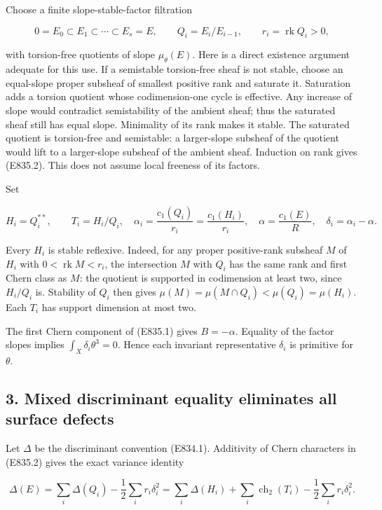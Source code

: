 Choose a finite slope-stable-factor filtration

\[
 0=E_0\subset E_1\subset\cdots\subset E_s=E,
 \qquad Q_i=E_i/E_{i-1},\qquad r_i=\operatorname{rk}Q_i>0,
 \tag{E835.2}
\]

with torsion-free quotients of slope \(\mu_\theta(E)\). Here is a direct
existence argument adequate for this use. If a semistable torsion-free
sheaf is not stable, choose an equal-slope proper subsheaf of smallest
positive rank and saturate it. Saturation adds a torsion quotient whose
codimension-one cycle is effective. Any increase of slope would
contradict semistability of the ambient sheaf; thus the saturated sheaf
still has equal slope. Minimality of its rank makes it stable. The
saturated quotient is torsion-free and semistable: a larger-slope
subsheaf of the quotient would lift to a larger-slope subsheaf of the
ambient sheaf. Induction on rank gives (E835.2). This does not assume
local freeness of its factors.

Set

\[
 H_i=Q_i^{**},\qquad T_i=H_i/Q_i,
 \quad \alpha_i=\frac{c_1(Q_i)}{r_i}=\frac{c_1(H_i)}{r_i},
 \quad \alpha=\frac{c_1(E)}R,\quad\delta_i=\alpha_i-\alpha.
 \tag{E835.3}
\]

Every \(H_i\) is stable reflexive. Indeed, for any proper positive-rank
subsheaf \(M\) of \(H_i\) with \(0<\operatorname{rk}M<r_i\), the
intersection \(M\) with \(Q_i\) has the same rank and first Chern class as \(M\):
the quotient is supported in codimension at least two, since \(H_i/Q_i\)
is. Stability of \(Q_i\) then gives \(\mu(M)=\mu(M\cap Q_i)<\mu(Q_i)=\mu(H_i)\). Each \(T_i\) has support dimension at
most two.

The first Chern component of (E835.1) gives \(B=-\alpha\). Equality of the
factor slopes implies \(\int_X\delta_i\theta^3=0\). Hence each
invariant representative \(\delta_i\) is primitive for \(\theta\).

\subsection{3. Mixed discriminant equality eliminates all surface
defects}\label{SF-E835:mixed-discriminant-equality-eliminates-all-surface-defects}

Let \(\Delta\) be the discriminant convention (E834.1). Additivity of Chern
characters in (E835.2) gives the exact variance identity

\[
 \Delta(E)=\sum_i\Delta(Q_i)-\frac12\sum_i r_i\delta_i^2
          =\sum_i\Delta(H_i)+\sum_i\operatorname{ch}_2(T_i)
                         -\frac12\sum_i r_i\delta_i^2.
 \tag{E835.4}
\]

